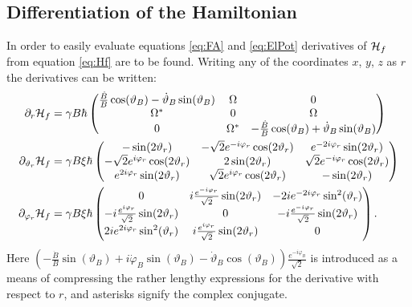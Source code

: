 \documentclass[a4paper]{article}
\begin{document}
\subsection{Differentiation of the Hamiltonian}\label{sec:Hdiff}
In order to easily evaluate equations \ref{eq:FA} and \ref{eq:ElPot} derivatives of
\(\mathbb{\cal H}_f\) from equation \ref{eq:Hf} are to be found. Writing any of the coordinates \(x\), \(y\), \(z\)
as \(r\) the derivatives can
be written:
\begin{align}\label{eq:diffham1}
        \partial_r\mathbb{\cal H}_f  &= \gamma B \hbar{} \pmqty{
 \frac{\dot B}{B}\cos(\vartheta_B) -\dot \vartheta_B \sin(\vartheta_B) & \Omega & 0 \\
 \Omega^{*} & 0 & \Omega\\
 0 & \Omega^{*}& -\frac{\dot B}{B}\cos(\vartheta_B) + \dot \vartheta_B \sin(\vartheta_B)
        }\\
        \label{eq:diffham2}
        \partial_{\vartheta_r} \mathbb{\cal H}_f &= \gamma B \xi \hbar{}\pmqty{
                -\sin(2\vartheta_r) & -\sqrt{2}  e^{-i\varphi_r}\cos(2\vartheta_r) &
                 e^{-2i\varphi_r}\sin(2\vartheta_r)\\
                -\sqrt{2}  e^{i\varphi_r}\cos(2\vartheta_r) & 2\sin(2\vartheta_r) &
                \sqrt{2} e^{-i\varphi_r}\cos(2\vartheta_r)\\
                 e^{2i\varphi_r}\sin(2\vartheta_r) & \sqrt{2} 
                e^{i\varphi_r}\cos(2\vartheta_r) & -\sin(2\vartheta_r)
        }\\
        \label{eq:diffham3}
        \partial_{\varphi_r} \mathbb{\cal H}_f &= \gamma B \xi \hbar{}\pmqty{
                0 & i  \frac{e^{-i\varphi_r}}{\sqrt{2} }\sin(2\vartheta_r) &
                -2i e^{-2i\varphi_r}\sin[2](\vartheta_r)\\
                -i  \frac{e^{i\varphi_r}}{\sqrt{2} }\sin(2\vartheta_r) & 0 & -i 
                \frac{e^{-i\varphi_r}}{\sqrt{2} }\sin(2\vartheta_r) \\
                2i e^{2i\varphi_r}\sin[2](\vartheta_r) & i \frac{e^{i\varphi_r}}{\sqrt{2}
                }\sin(2\vartheta_r) & 0
        }
.\end{align}
Here \((-\frac{\dot B}{B}\sin(\vartheta_B) + i\dot \varphi_B 
 \sin(\vartheta_B) -\dot \vartheta_B \cos(\vartheta_B)) \frac{e^{-i\varphi_B}}{\sqrt{2}}\) is introduced as a means of compressing the
rather lengthy expressions for the derivative with respect to \(r\), and asterisks signify
the complex conjugate.
\end{document}
